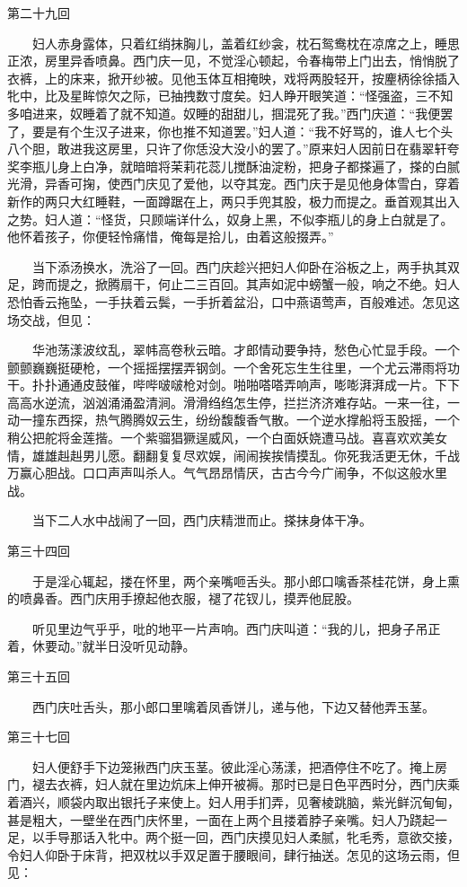 第二十九回

　　妇人赤身露体，只着红绡抹胸儿，盖着红纱衾，枕石鸳鸯枕在凉席之上，睡思正浓，房里异香喷鼻。西门庆一见，不觉淫心顿起，令春梅带上门出去，悄悄脱了衣裤，上的床来，掀开纱被。见他玉体互相掩映，戏将两股轻开，按麈柄徐徐插入牝中，比及星眸惊欠之际，已抽拽数寸度矣。妇人睁开眼笑道：“怪强盗，三不知多咱进来，奴睡着了就不知道。奴睡的甜甜儿，掴混死了我。”西门庆道：“我便罢了，要是有个生汉子进来，你也推不知道罢。”妇人道：“我不好骂的，谁人七个头八个胆，敢进我这房里，只许了你恁没大没小的罢了。”原来妇人因前日在翡翠轩夸奖李瓶儿身上白净，就暗暗将茉莉花蕊儿搅酥油淀粉，把身子都搽遍了，搽的白腻光滑，异香可掬，使西门庆见了爱他，以夺其宠。西门庆于是见他身体雪白，穿着新作的两只大红睡鞋，一面蹲踞在上，两只手兜其股，极力而提之。垂首观其出入之势。妇人道：“怪货，只顾端详什么，奴身上黑，不似李瓶儿的身上白就是了。他怀着孩子，你便轻怜痛惜，俺每是拾儿，由着这般掇弄。”

　　当下添汤换水，洗浴了一回。西门庆趁兴把妇人仰卧在浴板之上，两手执其双足，跨而提之，掀腾扇干，何止二三百回。其声如泥中螃蟹一般，响之不绝。妇人恐怕香云拖坠，一手扶着云鬓，一手折着盆沿，口中燕语莺声，百般难述。怎见这场交战，但见：

　　华池荡漾波纹乱，翠帏高卷秋云暗。才郎情动要争持，愁色心忙显手段。一个颤颤巍巍挺硬枪，一个摇摇摆摆弄钢剑。一个舍死忘生生往里，一个尤云滞雨将功干。扑扑通通皮鼓催，哔哔啵啵枪对剑。啪啪嗒嗒弄响声，嘭嘭湃湃成一片。下下高高水逆流，汹汹涌涌盈清涧。滑滑绉绉怎生停，拦拦济济难存站。一来一往，一动一撞东西探，热气腾腾奴云生，纷纷馥馥香气散。一个逆水撑船将玉股摇，一个稍公把舵将金莲揩。一个紫骝猖獗逞威风，一个白面妖娆遭马战。喜喜欢欢美女情，雄雄赳赳男儿愿。翻翻复复尽欢娱，闹闹挨挨情摸乱。你死我活更无休，千战万赢心胆战。口口声声叫杀人。气气昂昂情厌，古古今今广闹争，不似这般水里战。

　　当下二人水中战闹了一回，西门庆精泄而止。搽抹身体干净。


第三十四回

　　于是淫心辄起，搂在怀里，两个亲嘴咂舌头。那小郎口噙香茶桂花饼，身上熏的喷鼻香。西门庆用手撩起他衣服，褪了花钗儿，摸弄他屁股。

　　听见里边气乎乎，吡的地平一片声响。西门庆叫道：“我的儿，把身子吊正着，休要动。”就半日没听见动静。

第三十五回

　　西门庆吐舌头，那小郎口里噙着凤香饼儿，递与他，下边又替他弄玉茎。

第三十七回

　　妇人便舒手下边笼揪西门庆玉茎。彼此淫心荡漾，把酒停住不吃了。掩上房门，褪去衣裤，妇人就在里边炕床上伸开被褥。那时已是日色平西时分，西门庆乘着酒兴，顺袋内取出银托子来使上。妇人用手扪弄，见奢棱跳脑，紫光鲜沉甸甸，甚是粗大，一壁坐在西门庆怀里，一面在上两个且搂着脖子亲嘴。妇人乃跷起一足，以手导那话入牝中。两个挺一回，西门庆摸见妇人柔腻，牝毛秀，意欲交接，令妇人仰卧于床背，把双枕以手双足置于腰眼间，肆行抽送。怎见的这场云雨，但见：

